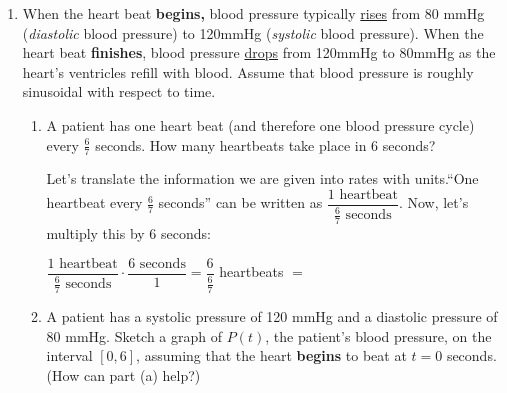\documentclass{article}
\begin{document}
\begin{enumerate}
\begin{solution}
Common \textbf{non-identities}:
\begin{itemize}
    \item $\sin(A+B) \neq \sin A + \sin B$
    \item $\cos(A+B) \neq \cos A + \cos B$
    \item $\sin(AB) \neq \sin A  \sin B$
    \item $\cos(AB) \neq \cos A  \cos B$
\end{itemize}

\end{solution}

\newpage

\item  When the heart beat \textbf{begins,} blood pressure typically \underline{rises} from 80 mmHg (\textit{diastolic} blood pressure) to 120mmHg (\textit{systolic} blood pressure). When the heart beat \textbf{finishes}, blood pressure \underline{drops} from 120mmHg to 80mmHg as the heart's ventricles refill with blood. Assume that blood pressure is roughly sinusoidal with respect to time.
\begin{enumerate}
\item A patient has one heart beat (and therefore one blood pressure cycle) every $\frac{6}{7}$ seconds. How many heartbeats take place in 6 seconds?

\begin{solution}
    Let's translate the information we are given into rates with units.``One heartbeat every $\frac{6}{7}$ seconds'' can be written as $\dfrac{1\text{ heartbeat}}{\frac{6}{7}\text{ seconds}}$. Now, let's multiply this by $6$ seconds:
    \begin{center}
        $\dfrac{1\text{ heartbeat}}{\frac{6}{7}\text{ seconds}} \cdot  \dfrac{6\text{ seconds}}{1}=\dfrac{6}{\frac{6}{7}}$ heartbeats $=$ 
    \end{center}
    
\end{solution}
\vfill
\item A patient has a systolic pressure of 120 mmHg and a diastolic pressure of 80 mmHg. Sketch a graph of $P(t)$, the patient's blood pressure, on the interval $[0, 6]$, assuming that the heart \textbf{begins} to beat at $t=0$ seconds. (How can part (a) help?) 


\end{enumerate}
\end{enumerate}
\end{document}
